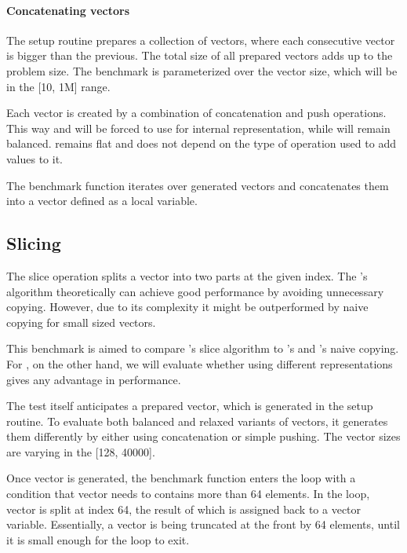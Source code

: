 \paragraph*{Concatenating vectors}
The setup routine prepares a collection of vectors, where each consecutive vector is bigger than the previous. The total size of all prepared vectors adds up to the problem size. The benchmark is parameterized over the vector size, which will be in the [10, 1M] range. 

Each vector is created by a combination of concatenation and push operations. This way \pvec{} and \rrbvec{} will be forced to use \rrbtree{} for internal representation, while \rbvec{} will remain balanced. \stdvec{} remains flat and does not depend on the type of operation used to add values to it. 

The benchmark function iterates over generated vectors and concatenates them into a vector defined as a local variable. 

\subsection{Slicing}

The slice operation splits a vector into two parts at the given index. The \rrbtree{}'s algorithm theoretically can achieve good performance by avoiding unnecessary copying. However, due to its complexity it might be outperformed by naive copying for small sized vectors. 


This benchmark is aimed to compare \rrbvec{}'s slice algorithm to \stdvec{}'s and \rbvec{}'s naive copying. For \pvec{}, on the other hand, we will evaluate whether using different representations gives any advantage in performance. 


The test itself anticipates a prepared vector, which is generated in the setup routine. To evaluate both balanced and relaxed variants of vectors, it generates them differently by either using concatenation or simple pushing. The vector sizes are varying in the [128, 40000]. 

Once vector is generated, the benchmark function enters the loop with a condition that vector needs to contains more than 64 elements. In the loop, vector is split at index 64, the result of which is assigned back to a vector variable. Essentially, a vector is being truncated at the front by 64 elements, until it is small enough for the loop to exit. 

